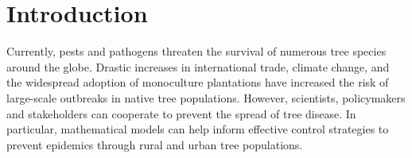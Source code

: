 
\chapter{Introduction}


Currently, pests and pathogens threaten the survival of numerous tree species around the globe. 
Drastic increases in international trade, climate change, and the widespread
adoption of monoculture plantations have increased the risk of large-scale outbreaks in native tree populations. 
However, scientists, policymakers and stakeholders can cooperate to prevent the spread of tree disease. 
In particular, mathematical models can help inform effective control strategies to prevent epidemics through rural and urban tree populations. 

